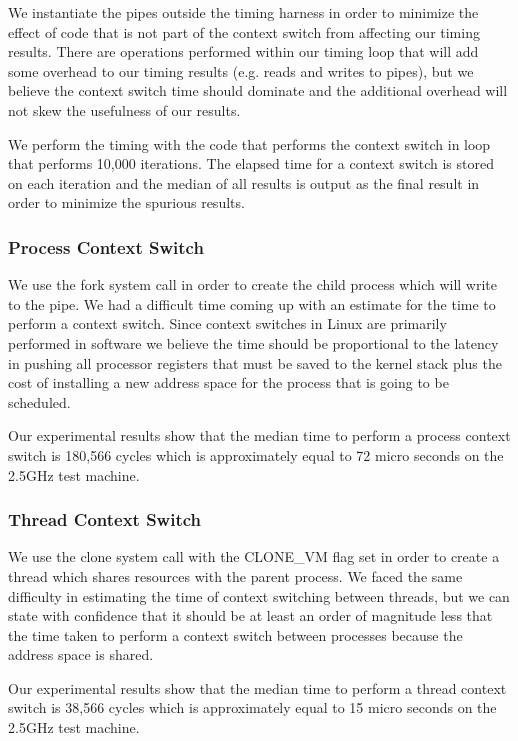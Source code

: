 We instantiate the pipes outside the timing harness in order to minimize the effect
of code that is not part of the context switch from affecting our timing
results. There are operations performed within our timing loop that will add
some overhead to our timing results (e.g. reads and writes to pipes), but we
believe the context switch time should dominate and the additional overhead will
not skew the usefulness of our results.

We perform the timing with the code that performs the context switch in loop
that performs 10,000 iterations. The elapsed time for a context switch is stored
on each iteration and the median of all results is output as the final result in
order to minimize the spurious results.

\subsubsection{Process Context Switch} 
We use the fork system call in order to create the child process which will
write to the pipe. We had a difficult time coming up with an estimate for the
time to perform a context switch. Since context switches in Linux are primarily
performed in software we believe the time should be proportional to the latency
in pushing all processor registers that must be saved to the kernel stack plus
the cost of installing a new address space for the process that is going to be
scheduled.

Our experimental results show that the median time to perform a process context
switch is 180,566 cycles which is approximately equal to 72 micro seconds on the
2.5GHz test machine. 

\subsubsection{Thread Context Switch}
We use the clone system call with the CLONE\_VM flag set in order to create a
thread which shares resources with the parent process. We faced the same
difficulty in estimating the time of context switching between threads, but we
can state with confidence that it should be at least an order of magnitude less
that the time taken to perform a context switch between processes because the
address space is shared.

Our experimental results show that the median time to perform a thread context
switch is 38,566 cycles which is approximately equal to 15 micro seconds on the
2.5GHz test machine.
